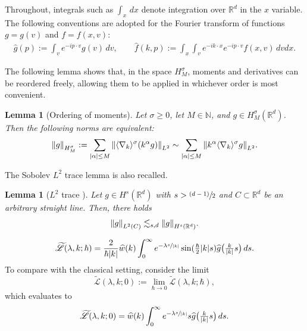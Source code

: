 \documentclass[10pt,a4paper]{article}
\newcommand{\psfrac}[2]{\sfrac{(#1)}{#2}}
\theoremstyle{plain}
\newtheorem{lemma}[theorem]{Lemma}
\theoremstyle{remark}
\newcommand{\bbr}[1]{\bigl(#1 \bigr)}
\newcommand{\ak}{\abs{k}}
\newcommand{\jb}[1]{\langle#1\rangle}
\newcommand{\mytextfrac}[2]{{\textstyle\frac{#1}{#2}}}
\newcommand{\R}{\mathbb{R}}
\newcommand{\lam}{\lambda}
\begin{document}
Throughout, integrals such as $\int_x\,dx$ denote integration over $\R^d$ in the $x$ variable. The following conventions are adopted for the Fourier transform of functions $g=g(v)$ and $f=f(x,v)$:\vspace{-3pt}
\begin{align*}
\widehat g(p):=\int_v e^{-ip\cdot v}g(v)\,dv,\qquad \widehat f(k,p):=\int_x\int_ve^{-ik\cdot x}e^{-ip\cdot v}f(x,v)\,dvdx.
\end{align*}

The following lemma shows that, in the space $H^\sigma_M$, moments and derivatives can be reordered freely, allowing them to be applied in whichever order is most convenient.
\begin{lemma}[Ordering of moments]\label{lemmaHMnorm}
Let $\sigma\geq0$, let $M\in\mathbb N$, and $g\in H^\sigma_M(\R^d)$. Then the following norms are equivalent:
\begin{align*}
\norm{g}_{H^\sigma_M}:=\sum_{\abs{\alpha}\leq M}\norm{\jb{\nabla_{k}}^\sigma (k^\alpha g)}_{L^2}\sim\sum_{\abs{\alpha}\leq M}\norm{k^\alpha\jb{\nabla_{k}}^\sigma g}_{L^2}.
\end{align*}
\end{lemma}

The Sobolev $L^2$ trace lemma is also recalled.
\begin{lemma}[$L^2$ trace {\cite[Lem.\,2.15]{BedrossianMasmoudiMouhot2018}}] \label{L2trace}
Let $g\in H^s(\R^d)$ with $s>\psfrac{d-1}{2}$ and $C\subset\R^d$ be an arbitrary straight line. Then, there holds
\begin{align*}
\norm{g}_{L^2(C)}\lesssim_{s,d}\norm{g}_{H^s(\R^d)}.
\end{align*}
\end{lemma}

\begin{align}
\widetilde {\mathscr L}(\lam,k;\hbar)
= \frac{2}{\hbar\ak} \widehat w(k) \int_0^\infty e^{-\lam \sfrac{s}{\ak}} \sin(\mytextfrac{\hbar}{2} \ak s) \widehat g\bbr{\mytextfrac{k}{\ak}s} \, ds. \label{Lingoodcoordinates}
\end{align}
To compare with the classical setting, consider the limit
\[
\widetilde{\mathscr{L}}(\lambda,k;0) := \lim_{\hbar \to 0} \widetilde{\mathscr{L}}(\lambda,k;\hbar),
\]
which evaluates to\vspace*{-3pt}
\[
\widetilde {\mathscr{L}}(\lam,k;0)
= \widehat w(k) \int_0^\infty e^{-\lam \sfrac{s}{\ak}} s \widehat g\bbr{\mytextfrac{k}{\ak}s} \, ds.
\]
\end{document}
